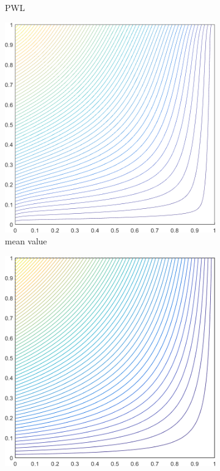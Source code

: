\begin{figure}
{\begin{subfigure}[b]{0.39\textwidth}
		\caption{PWL}
	\end{subfigure}
}
	\vspace{3mm}
{
	\begin{subfigure}[b]{0.39\textwidth}
		\centering
		\includegraphics[width=\textwidth]{figures/sec_BF/square_MV1_contour_b4.png}
		\caption{mean value}
	\end{subfigure}
	\hspace{1.5cm}
	\begin{subfigure}[b]{0.39\textwidth}
		\centering
		\includegraphics[width=\textwidth]{figures/sec_BF/square_MAXENT1_contour_b4.png}

\end{subfigure}}
\end{figure}
